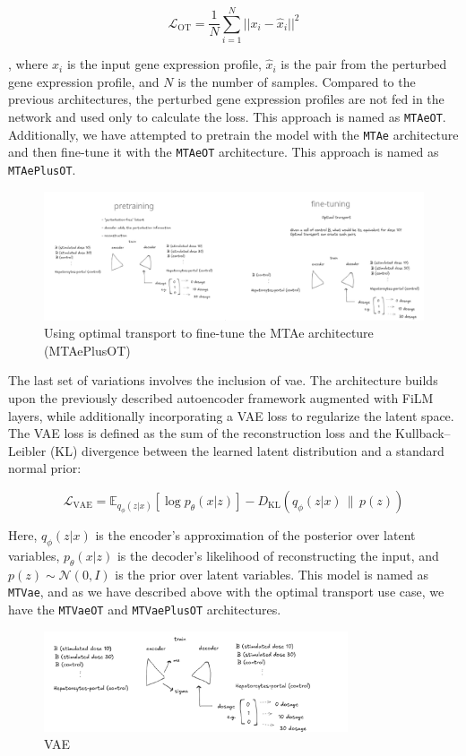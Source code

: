 \documentclass[12pt, a4paper]{article}
\begin{document}
\[
\mathcal{L}_{\text{OT}} = \frac{1}{N} \sum_{i=1}^{N} ||x_i - \hat{x}_i||^2 
\]

, where $x_i$ is the input gene expression profile, $\hat{x}_i$ is the pair from the perturbed gene expression profile, and $N$ is the number of samples. Compared to the previous architectures, the perturbed gene expression profiles are not fed in the network and used only to calculate the loss. This approach is named as \verb|MTAeOT|. Additionally, we have attempted to pretrain the model with the \verb|MTAe| architecture and then fine-tune it with the \verb|MTAeOT| architecture. This approach is named as \verb|MTAePlusOT|.

\begin{figure}
    \centering
    \includegraphics[width=\textwidth]{ae_ot_sketch.png}
    \caption{Using optimal transport to fine-tune the MTAe architecture (MTAePlusOT)}
\end{figure}

The last set of variations involves the inclusion of \gls{vae}. The architecture builds upon the previously described autoencoder framework augmented with FiLM layers, while additionally incorporating a VAE loss to regularize the latent space. The VAE loss is defined as the sum of the reconstruction loss and the Kullback--Leibler (KL) divergence between the learned latent distribution and a standard normal prior:

\[
\mathcal{L}_{\text{VAE}} = \mathbb{E}_{q_\phi(z|x)}[\log p_\theta(x|z)] - D_{\text{KL}}(q_\phi(z|x) \,\|\, p(z))
\]

Here, $q_\phi(z|x)$ is the encoder's approximation of the posterior over latent variables, $p_\theta(x|z)$ is the decoder's likelihood of reconstructing the input, and $p(z) \sim \mathcal{N}(0, I)$ is the prior over latent variables. This model is named as \verb|MTVae|, and as we have described above with the optimal transport use case, we have the \verb|MTVaeOT| and \verb|MTVaePlusOT| architectures.

\begin{figure}
    \centering
    \includegraphics[width=0.8\textwidth]{vae_sketch.png}
    \caption{VAE}
\end{figure}
\end{document}
